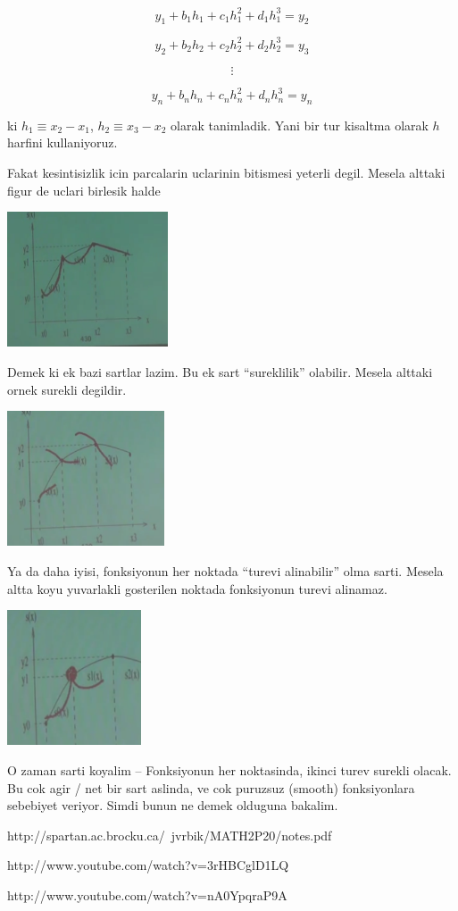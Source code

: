 \documentclass[12pt,fleqn]{article}\usepackage{../common}
\begin{document}
\[ y_1 + b_1h_1 + c_1h_1^2 + d_1h_1^3 = y_2 \]

\[ y_2 + b_2h_2 + c_2h_2^2 + d_2h_2^3 = y_3 \]

\[ \vdots \]

\[ y_n + b_nh_n + c_nh_n^2 + d_nh_n^3 = y_n \]

ki $h_1 \equiv x_2 - x_1$, $h_2 \equiv x_3 - x_2$ olarak tanimladik. Yani bir tur kisaltma 
olarak $h$ harfini kullaniyoruz. 

Fakat kesintisizlik icin parcalarin uclarinin bitismesi yeterli
degil. Mesela alttaki figur de uclari birlesik halde

\includegraphics[height=4cm]{spline3.png}

Demek ki ek bazi sartlar lazim. Bu ek sart ``sureklilik'' olabilir. Mesela
alttaki ornek surekli degildir.

\includegraphics[height=4cm]{spline5.png}

Ya da daha iyisi, fonksiyonun her noktada ``turevi alinabilir'' olma
sarti. Mesela altta koyu yuvarlakli gosterilen noktada fonksiyonun turevi
alinamaz.

\includegraphics[height=4cm]{spline4.png}

O zaman sarti koyalim -- Fonksiyonun her noktasinda, ikinci turev surekli
olacak. Bu cok agir / net bir sart aslinda, ve cok puruzsuz (smooth)
fonksiyonlara sebebiyet veriyor. Simdi bunun ne demek olduguna bakalim.
















http://spartan.ac.brocku.ca/~jvrbik/MATH2P20/notes.pdf

http://www.youtube.com/watch?v=3rHBCglD1LQ

http://www.youtube.com/watch?v=nA0YpqraP9A
\end{document}
